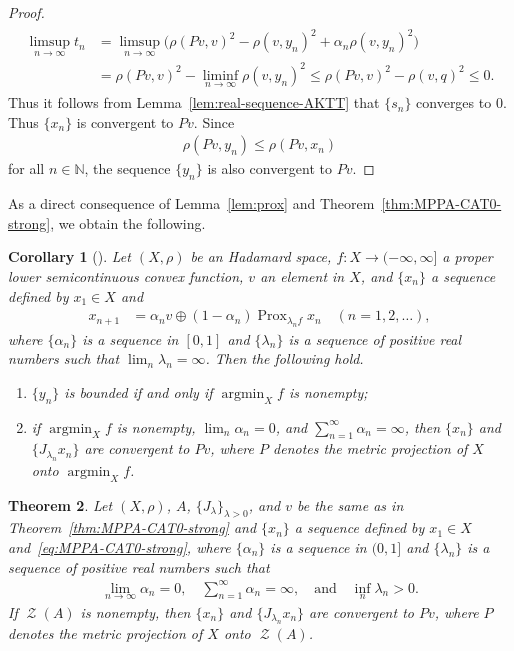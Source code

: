 \documentclass[draft]{amsart}
\numberwithin{equation}{section}
\def\N{\mathbb N}
\DeclareMathOperator*{\Argmin}{argmin}
\DeclareMathOperator{\Prox}{Prox}
\DeclareMathOperator{\Zer}{\mathcal{Z}}
\theoremstyle{plain}
\newtheorem{theorem}{Theorem}[section]
\newtheorem{corollary}[theorem]{Corollary}
\theoremstyle{definition}
\theoremstyle{remark}
\begin{document}
\begin{proof}
\begin{align*}
  \begin{split}
   \limsup_{n\to \infty}t_n 
   &=\limsup_{n\to \infty}\bigl(\rho(Pv, v)^2 -\rho(v, y_n)^2 + \alpha_n\rho(v, y_n)^2 \bigr) \\
   &=\rho(Pv, v)^2 -\liminf_{n\to \infty} \rho(v, y_n)^2 
  \leq \rho(Pv, v)^2 - \rho(v, q)^2 \leq 0. 
  \end{split}
 \end{align*}
 Thus it follows from Lemma~\ref{lem:real-sequence-AKTT} that 
 $\{s_n\}$ converges to $0$. Thus $\{x_n\}$ is convergent to $Pv$. Since 
 \begin{align*}
  \rho(Pv, y_n) \leq \rho(Pv, x_n)
 \end{align*}
 for all $n\in \N$, the sequence $\{y_n\}$ is also convergent to $Pv$. 
\end{proof}

As a direct consequence of Lemma~\ref{lem:prox} 
and Theorem~\ref{thm:MPPA-CAT0-strong}, we obtain the following. 

\begin{corollary}[\cite{MR3574140}]\label{cor:MPPA-CAT0-strong}
 Let $(X, \rho)$ be an Hadamard space, 
 $f\colon X\to (-\infty, \infty]$ a proper lower semicontinuous convex function, 
 $v$ an element in $X$, and 
 $\{x_n\}$ a sequence defined by $x_1\in X$ and 
 \begin{align}
  x_{n+1} &= \alpha_{n} v \oplus (1-\alpha_n) \Prox_{\lambda_n f}x_n 
  \quad (n=1,2,\dots),    
 \end{align}
 where $\{\alpha_n\}$ is a sequence in $[0,1]$ 
 and $\{\lambda_n\}$ is a sequence of positive real numbers such that 
 $\lim_{n}\lambda_n = \infty$. 
 Then the following hold. 
 \begin{enumerate}
  \item[(i)] $\{y_n\}$ is bounded 
 if and only if $\Argmin_X f$ is nonempty; 
  \item[(ii)] if $\Argmin_X f$ is nonempty, $\lim_{n}\alpha_n =0$, and 
 $\sum_{n=1}^{\infty}\alpha_n=\infty$, then 
 $\{x_n\}$ and $\{J_{\lambda_n}x_n\}$ are convergent to $Pv$, where 
 $P$ denotes the metric projection of $X$ onto $\Argmin_X f$. 
 \end{enumerate}
\end{corollary}

\begin{theorem}\label{thm:MPPA-CAT0-strong-another}
 Let $(X, \rho)$, $A$, $\{J_{\lambda}\}_{\lambda > 0}$, 
 and $v$ be the same as in Theorem~\ref{thm:MPPA-CAT0-strong} 
 and $\{x_n\}$ a sequence defined by $x_1\in X$ 
 and~\eqref{eq:MPPA-CAT0-strong}, 
 where $\{\alpha_n\}$ is a sequence in $(0,1]$ 
 and $\{\lambda_n\}$ is a sequence of positive real numbers such that 
 \begin{align*}
  \lim_{n\to \infty}\alpha_n = 0, \quad 
  \sum_{n=1}^{\infty}\alpha_n = \infty, 
  \quad \textrm{and} \quad 
  \inf_{n} \lambda_n >0. 
 \end{align*}
 If $\Zer(A)$ is nonempty, then 
 $\{x_n\}$ and $\{J_{\lambda_n}x_n\}$ are convergent to $Pv$, where 
 $P$ denotes the metric projection of $X$ onto $\Zer(A)$. 
\end{theorem}
\end{document}
